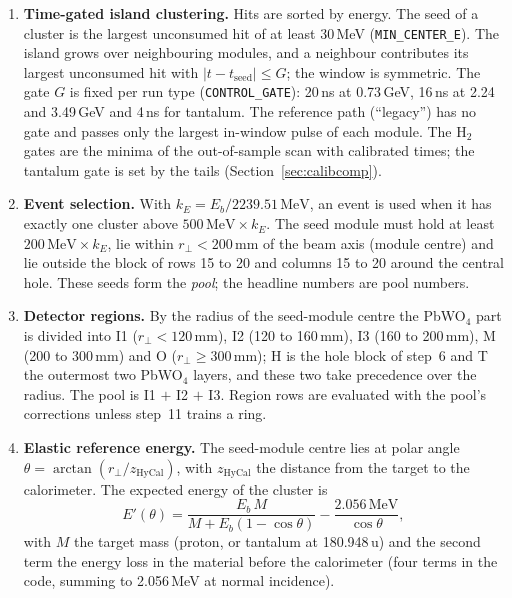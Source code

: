 \documentclass[11pt]{article}
\newcommand{\mev}{\,\mathrm{MeV}}
\newcommand{\code}[1]{\texttt{#1}}
\begin{document}
\begin{enumerate}
\item \textbf{Time-gated island clustering.} Hits are sorted by energy. The seed of a cluster is the largest unconsumed hit of at least 30\,MeV (\code{MIN\_CENTER\_E}). The island grows over neighbouring modules, and a neighbour contributes its largest unconsumed hit with $|t - t_{\mathrm{seed}}| \le G$; the window is symmetric. The gate $G$ is fixed per run type (\code{CONTROL\_GATE}): 20\,ns at 0.73\,GeV, 16\,ns at 2.24 and 3.49\,GeV and 4\,ns for tantalum. The reference path (``legacy'') has no gate and passes only the largest in-window pulse of each module. The H$_2$ gates are the minima of the out-of-sample scan with calibrated times; the tantalum gate is set by the tails (Section~\ref{sec:calibcomp}).
\item \textbf{Event selection.} With $k_E = E_b / 2239.51\mev$, an event is used when it has exactly one cluster above $500\mev \times k_E$. The seed module must hold at least $200\mev \times k_E$, lie within $r_\perp < 200$\,mm of the beam axis (module centre) and lie outside the block of rows 15 to 20 and columns 15 to 20 around the central hole. These seeds form the \emph{pool}; the headline numbers are pool numbers.
\item \textbf{Detector regions.} By the radius of the seed-module centre the PbWO$_4$ part is divided into I1 ($r_\perp < 120$\,mm), I2 (120 to 160\,mm), I3 (160 to 200\,mm), M (200 to 300\,mm) and O ($r_\perp \ge 300$\,mm); H is the hole block of step~6 and T the outermost two PbWO$_4$ layers, and these two take precedence over the radius. The pool is I1 $+$ I2 $+$ I3. Region rows are evaluated with the pool's corrections unless step~11 trains a ring.
\item \textbf{Elastic reference energy.} The seed-module centre lies at polar angle $\theta = \arctan(r_\perp/z_{\mathrm{HyCal}})$, with $z_{\mathrm{HyCal}}$ the distance from the target to the calorimeter. The expected energy of the cluster is
\begin{equation}
E'(\theta) = \frac{E_b\, M}{M + E_b (1 - \cos\theta)} - \frac{2.056\mev}{\cos\theta},
\label{eq:eprime}
\end{equation}
with $M$ the target mass (proton, or tantalum at 180.948\,u) and the second term the energy loss in the material before the calorimeter (four terms in the code, summing to 2.056\,MeV at normal incidence).

\end{enumerate}
\end{document}
